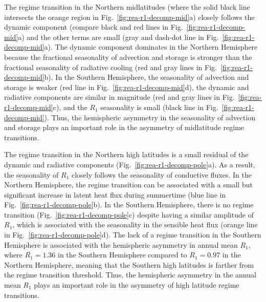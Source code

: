 \documentclass{ametsocV5}
\begin{document}
    The regime transition in the Northern midlatitudes (where the solid black line intersects the orange region in Fig.~\ref{fig:rea-r1-decomp-mid}a) closely follows the dynamic component (compare black and red lines in Fig.~\ref{fig:rea-r1-decomp-mid}a) and the other terms are small (gray and dash-dot line in Fig.~\ref{fig:rea-r1-decomp-mid}a). The dynamic component dominates in the Northern Hemisphere because the fractional seasonality of advection and storage is stronger than the fractional seasonality of radiative cooling (red and gray lines in Fig.~\ref{fig:rea-r1-decomp-mid}b). In the Southern Hemisphere, the seasonality of advection and storage is weaker (red line in Fig.~\ref{fig:rea-r1-decomp-mid}d), the dynamic and radiative components are similar in magnitude (red and gray lines in Fig.~\ref{fig:rea-r1-decomp-mid}c), and the $R_1$ seasonality is small (black line in Fig.~\ref{fig:rea-r1-decomp-mid}). Thus, the hemispheric asymmetry in the seasonality of advection and storage plays an important role in the asymmetry of midlatitude regime transitions. %


    The regime transition in the Northern high latitudes is a small residual of the dynamic and radiative components (Fig.~\ref{fig:rea-r1-decomp-pole}a). As a result, the seasonality of $R_1$ closely follows the seasonality of conductive fluxes. In the Northern Hemisphere, the regime transition can be associated with a small but significant increase in latent heat flux during summertime (blue line in Fig.~\ref{fig:rea-r1-decomp-pole}b). In the Southern Hemisphere, there is no regime transition (Fig.~\ref{fig:rea-r1-decomp-pole}c) despite having a similar amplitude of $R_1$, which is associated with the seasonality in the sensible heat flux (orange line in Fig.~\ref{fig:rea-r1-decomp-pole}d). The lack of a regime transition in the Southern Hemisphere is associated with the hemispheric asymmetry in annual mean $R_1$, where $\overline{R_1}=1.36$ in the Southern Hemisphere compared to $R_1=0.97$ in the Northern Hemisphere, meaning that the Southern high latitudes is farther from the regime transition threshold. Thus, the hemispheric asymmetry in the annual mean $R_1$ plays an important role in the asymmetry of high latitude regime transitions.
\end{document}
